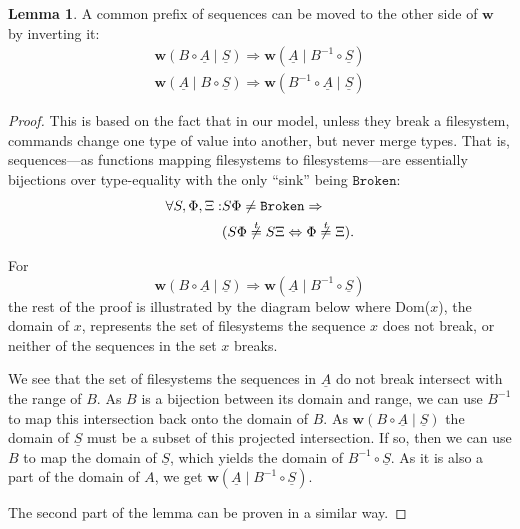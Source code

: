 \documentclass[12pt]{article}
\newcommand{\fsbroken}{\mathtt{Broken}} %
\newcommand{\FS}{\Phi} %
\newcommand{\GS}{\Xi} %
\newcommand{\cc}{\circ} %
\newcommand{\workssign}{\mathbf{w}}
\newcommand{\worksc}[2]{\workssign({#1}\mathrel{|}{#2})}
\newcommand{\ntypeeq}{\centernot{\stackrel{t}{=}}}
\newcommand{\seqset}[1]{\underline{#1}} %
\theoremstyle{definition}
\newtheorem{mylem}{Lemma}
\begin{document}
\begin{mylem}\label{r_invmove}
A common prefix of sequences can be moved to the other side of $\workssign$ by inverting it:
\begin{gather*}
\worksc{B\cc \seqset{A}}{\seqset{S}} \Rightarrow \worksc{\seqset{A}}{B^{-1}\cc \seqset{S}} \\
\worksc{\seqset{A}}{B\cc \seqset{S}} \Rightarrow \worksc{B^{-1}\cc \seqset{A}}{\seqset{S}}
\end{gather*}
\end{mylem}
\begin{proof}
This is based on the fact that in our model, unless they break a filesystem,
commands change one type of value into another, but never merge types.
That is,
sequences---as functions mapping filesystems to filesystems---are
essentially bijections over type-equality
with the only ``sink'' being $\fsbroken$:
\begin{align*}
\forall S,\FS,\GS: &S\FS\neq\fsbroken \Rightarrow \\
&(S\FS\ntypeeq S\GS \Leftrightarrow \FS\ntypeeq \GS).
\end{align*}

For
\[ \worksc{B\cc \seqset{A}}{\seqset{S}} \Rightarrow \worksc{\seqset{A}}{B^{-1}\cc \seqset{S}} \]
the rest of the proof is illustrated by the diagram below
where Dom($x$), the domain of $x$, represents the set of filesystems
the sequence $x$ does not break, or neither of the sequences in the set $x$ breaks.


We see that the set of filesystems the sequences in $\seqset{A}$ do not break intersect with the range of $B$.
As $B$ is a bijection between its domain and range, we can use $B^{-1}$ to map this intersection back
onto the domain of $B$.
As $\worksc{B\cc \seqset{A}}{\seqset{S}}$ the domain of $\seqset{S}$ must be a subset of this
projected intersection.
If so, then we can use $B$ to map the domain of $\seqset{S}$, which yields the domain of $B^{-1}\cc \seqset{S}$.
As it is also a part of the domain of $A$, we get $\worksc{\seqset{A}}{B^{-1}\cc \seqset{S}}$.

The second part of the lemma can be proven in a similar way.
\end{proof}
\end{document}
